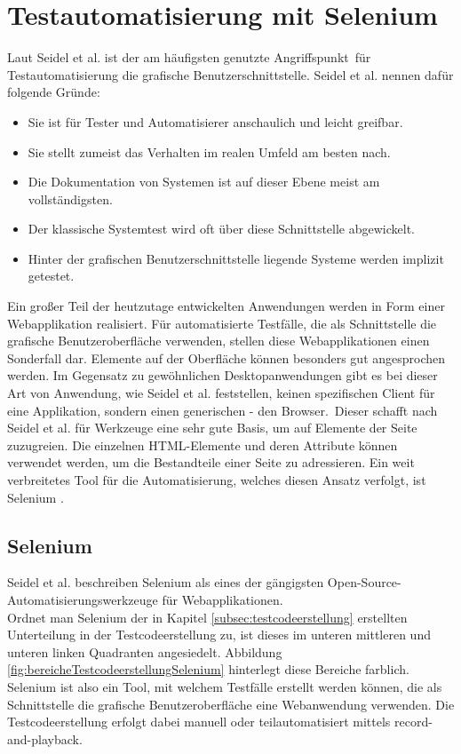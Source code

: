 \chapter{Testautomatisierung mit Selenium}
\label{sec:testautomatisierung_mit_selenium}

Laut Seidel et al. \cite[vgl. S. 48]{seidl_basiswissen_2012} ist der am häufigsten genutzte \frqq Angriffspunkt\flqq\ für Testautomatisierung die grafische Benutzerschnittstelle. Seidel et al. \cite[S. 48]{seidl_basiswissen_2012} nennen dafür folgende Gründe:
\begin{itemize}
\item \glqq Sie ist für Tester und Automatisierer anschaulich und leicht greifbar.\grqq
\item \glqq Sie stellt zumeist das Verhalten im realen Umfeld am besten nach.\grqq
\item \glqq Die Dokumentation von Systemen ist auf dieser Ebene meist am vollständigsten.\grqq
\item \glqq Der klassische Systemtest wird oft über diese Schnittstelle abgewickelt.\grqq
\item \glqq Hinter der grafischen Benutzerschnittstelle liegende Systeme werden implizit getestet.\grqq
\end{itemize}
Ein großer Teil der heutzutage entwickelten Anwendungen werden in Form einer Webapplikation realisiert. Für automatisierte Testfälle, die als Schnittstelle die grafische Benutzeroberfläche verwenden, stellen diese Webapplikationen einen Sonderfall dar. Elemente auf der Oberfläche können besonders gut angesprochen werden.
Im Gegensatz zu gewöhnlichen Desktopanwendungen gibt es bei dieser Art von Anwendung, wie Seidel et al. \cite[vgl. S. 88]{seidl_basiswissen_2012} feststellen, \glqq keinen spezifischen Client für eine Applikation, sondern einen generischen - den Browser.\grqq\ Dieser schafft nach Seidel et al.  \cite[vgl. S. 59]{seidl_basiswissen_2012} für Werkzeuge eine sehr  gute Basis, um auf Elemente der Seite zuzugreien. Die einzelnen HTML-Elemente und deren Attribute können verwendet werden, um die Bestandteile einer Seite zu adressieren.
Ein weit verbreitetes Tool für die Automatisierung, welches diesen Ansatz verfolgt, ist Selenium \cite{selenium_selenium_2015}.
\section{Selenium}
\label{sec:selenium}
Seidel et al. \cite[S. 142]{seidl_basiswissen_2012} beschreiben Selenium als \glqq eines der gängigsten Open-Source-Automatisierungswerkzeuge für Webapplikationen.\grqq\\
Ordnet man Selenium der in Kapitel \ref{subsec:testcodeerstellung} erstellten Unterteilung in der Testcodeerstellung zu, ist dieses im unteren mittleren und unteren linken Quadranten angesiedelt. Abbildung \ref{fig:bereicheTestcodeerstellungSelenium} hinterlegt diese Bereiche farblich.
Selenium ist also ein Tool, mit welchem Testfälle erstellt werden können, die als Schnittstelle die grafische Benutzeroberfläche eine Webanwendung verwenden. Die Testcodeerstellung erfolgt dabei manuell oder teilautomatisiert mittels \grq record-and-playback\grq.\\

